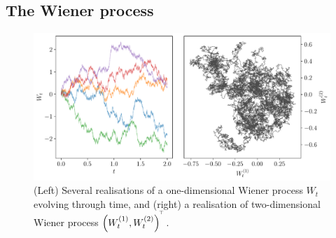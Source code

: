 \subsection{The Wiener process}

\begin{figure}
	\begin{center}
		\includegraphics[width=\textwidth]{chp02_background/figures/wiener_realisations}
		\caption{(Left) Several realisations of a one-dimensional Wiener process \(W_t\) evolving through time, and (right) a realisation of two-dimensional Wiener process \(\left(W_t^{(1)}, W_t^{(2)}\right)^{^{\!\top}}\).}
		\label{fig:wiener_rels}
	\end{center}
\end{figure}

